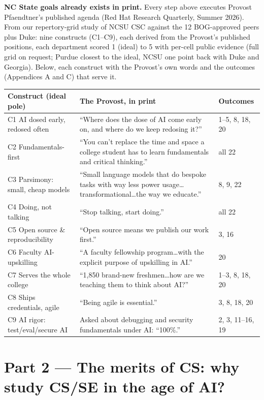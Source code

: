 \documentclass[10pt]{article}
\begin{document}
\textbf{NC State goals already exists in print.} Every step above executes Provost Pfaendtner's published agenda (Red Hat Research Quarterly, Summer 2026). From our repertory-grid study of NCSU CSC against the 12 BOG-approved peers plus Duke: nine constructs (C1--C9), each derived from the Provost's published positions, each department scored 1 (ideal) to 5 with per-cell public evidence (full grid on request; Purdue closest to the ideal, NCSU one point back with Duke and Georgia). Below, each construct with the Provost's own words and the outcomes (Appendices A and C) that serve it.

\vspace{2pt}
{\scriptsize\renewcommand{\arraystretch}{0.95}%
\begin{tabularx}{\textwidth}{@{}l X l@{}}
\toprule
\textbf{Construct (ideal pole)} & \textbf{The Provost, in print} & \textbf{Outcomes}\\
\midrule
C1 AI dosed early, redosed often & ``Where does the dose of AI come early on, and where do we keep redosing it?'' & 1--5, 8, 18, 20\\
C2 Fundamentals-first & ``You can't replace the time and space a college student has to learn fundamentals and critical thinking.'' & all 22\\
C3 Parsimony: small, cheap models & ``Small language models that do bespoke tasks with way less power usage\ldots transformational\ldots the way we educate.'' & 8, 9, 22\\
C4 Doing, not talking & ``Stop talking, start doing.'' & all 22\\
C5 Open source \& reproducibility & ``Open source means we publish our work first.'' & 3, 16\\
C6 Faculty AI-upskilling & ``A faculty fellowship program\ldots with the explicit purpose of upskilling in AI.'' & 20\\
C7 Serves the whole college & ``1,850 brand-new freshmen\ldots how are we teaching them to think about AI?'' & 1--3, 8, 18, 20\\
C8 Ships credentials, agile & ``Being agile is essential.'' & 3, 8, 18, 20\\
C9 AI rigor: test/eval/secure AI & Asked about debugging and security fundamentals under AI: ``100\%.'' & 2, 3, 11--16, 19\\
\bottomrule
\end{tabularx}}

\section{Part 2 --- The merits of CS: why study CS/SE in the age of AI?}
\end{document}

